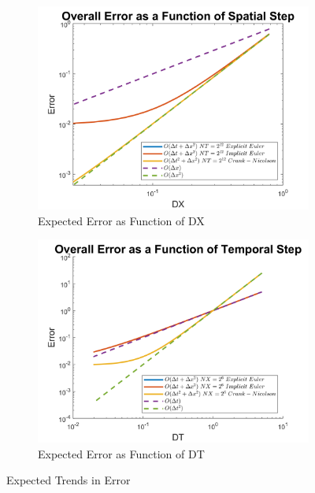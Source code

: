 \documentclass[10pt, letter, showtrims]{extarticle}
\begin{document}
		\FloatBarrier
		\begin{figure}[!h]
			\captionsetup[subfigure]{justification=centering}
			\centering
			
			\begin{subfigure}{.45\textwidth}
				\centering
				\includegraphics[width=1\linewidth]{"Figures/TrendsDX"}
				\caption{Expected Error as Function of DX}
				\label{fig:expectdx}
			\end{subfigure}
			\begin{subfigure}{.45\textwidth}
				\centering
				\includegraphics[width=1\linewidth]{"Figures/TrendsDT"}
				\caption{Expected Error as Function of DT}
				\label{fig:expectdt}
			\end{subfigure}
			
			\caption{Expected Trends in Error}
			\label{fig:expect}
		\end{figure}
		\FloatBarrier		
		
\end{document}
